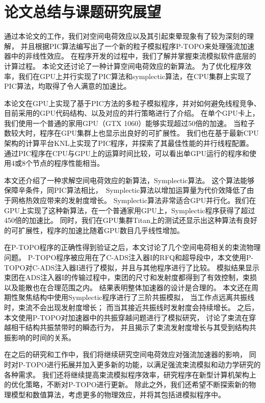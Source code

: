 
\chapter{论文总结与课题研究展望}
\label{chap:conclusion}
通过本论文的工作，我们对空间电荷效应以及其引起束晕现象有了较为深刻的理解，
并且根据PIC算法编写出了一个新的粒子模拟程序P-TOPO来处理强流加速器中的非线性效应。
在程序开发的过程中，我们了解并掌握束流模拟软件底层的计算过程。
本论文还讨论了一种计算空间电荷效应的新算法。
为了优化程序效率，我们在GPU上并行实现了PIC算法和symplectic算法，在CPU集群上实现了PIC算法，均取得了令人满意的加速比。

本论文在GPU上实现了基于PIC方法的多粒子模拟程序，并对如何避免线程竞争、目前采用的GPU代码结构、以及对应的并行策略进行了介绍。
在单个GPU卡上，我们使用一个普通的家用GPU（GTX 1060）能够实现超过50倍的加速。
当粒子数较大时，程序在GPU集群上也显示出良好的可扩展性。
我们也在基于最新CPU架构的计算平台KNL上实现了PIC程序，并探索了其最佳性能的并行线程配置。
通过PIC程序在CPU与GPU上的运算时间比较，可以看出单GPU运行的程序和使用4或8个节点的程序性能相当。

本文还介绍了一种求解空间电荷效应的新算法，Symplectic算法。
这个算法能够保障辛条件，同PIC算法相比，~Symplectic算法以增加运算量为代价效降低了由于网格热效应带来的发射度增长。
Symplectic算法非常适合GPU并行化。我们在GPU上实现了这种新算法，在一个普通家用GPU上，Symplectic程序获得了超过450倍的加速比。
同时，我们在GPU集群Titan上的测试还显示出这种算法有良好的可扩展性，程序的加速比随着GPU数目几乎线性增加。

在P-TOPO程序的正确性得到验证之后，本文讨论了几个空间电荷相关的束流物理问题。
P-TOPO程序被应用在了C-ADS注入器I的RFQ和超导段中，本文使用P-TOPO对C-ADS注入器I进行了模拟，并且与其他程序进行了比较。
模拟结果显示束团在ADS注入器I的传输过程中，束团的尺寸和发射度都得到了有效控制，束损以及能散也在合理范围之内。
结果表明整体加速器的设计是合理的。
本文还在周期性聚焦结构中使用Symplectic程序进行了三阶共振模拟，
当工作点远离共振线时，束流不会出现发射度增长；
而当其接近共振线时发射度会持续增长。
之后，本文使用P-TOPO对加速器中的共振穿越问题进行了模拟研究，
讨论了束流在穿越相干结构共振禁带时的瞬态行为，
并且揭示了束流发射度增长与其受到结构共振影响的时间的关系。

在之后的研究和工作中，我们将继续研究空间电荷效应对强流加速器的影响，
同时对P-TOPO进行拓展并加入更多新的功能，以满足强流束流模拟和动力学研究的各种需求。
我们还将继续提高束流模拟程序效率，研究程序在新型计算机架构上的优化策略，不断对P-TOPO进行更新。
除此之外，我们还希望不断探索新的物理模型和数值算法，考虑更多的物理效应，并将其包括进模拟程序中。